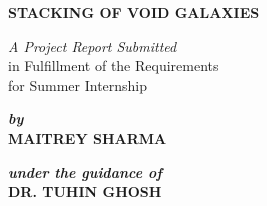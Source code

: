 \begin{changemargin}{0cm}{0cm}
\thispagestyle{empty}
\baselineskip25pt
\begin{center}
{\Large {\bf STACKING OF VOID GALAXIES}}\\
\end{center}

\vfill
\baselineskip15pt
\begin{center}
{\em A Project Report Submitted} \\
in Fulfillment of the Requirements \\
for Summer Internship \
\end{center}
\baselineskip25pt

\vfill
\begin{center} {\bf {\em by}} \\
{\large{\bf MAITREY SHARMA}} \\
\end{center}

\vfill
\begin{center} {\bf {\em under the guidance of}} \\
	{\large{\bf DR. TUHIN GHOSH}} \\
\end{center}


\end{changemargin}
